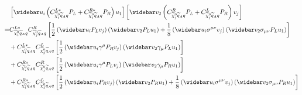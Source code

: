 \documentclass[english,notitlepage]{article}
\begin{document}
    \begin{align}
        \nonumber
          & \bclosed{\wbar{u}_i \pclosed{C^{L*}_{\nino[i]\wtilde{q}_A q} P_L + C^{R*}_{\nino[i]\wtilde{q}_A q} P_R} u_1}
        \bclosed{\wbar{v}_2 \pclosed{C^{R}_{\nino[j]\wtilde{q}_A q} P_L + C^{L}_{\nino[j]\wtilde{q}_A q} P_R} v_j}                                                                                                                                    \\
        \nonumber
        = & C^{L*}_{\nino[i]\wtilde{q}_A q}C^{R}_{\nino[j]\wtilde{q}_A q} \bclosed{\frac{1}{2}\pclosed{\wbar{u}_i P_L v_j} \pclosed{\wbar{v}_2 P_L u_1} + \frac{1}{8}\pclosed{\wbar{u}_i \sigma^{\mu\nu} v_j} \pclosed{\wbar{v}_2 \sigma_{\mu\nu} P_L u_1} }   \\
        \nonumber
          & + C^{L*}_{\nino[i]\wtilde{q}_A q}C^{L}_{\nino[j]\wtilde{q}_A q} \bclosed{\frac{1}{2}\pclosed{\wbar{u}_i \gamma^\mu P_R v_j} \pclosed{\wbar{v}_2 \gamma_\mu P_L u_1}}                                                                               \\
        \nonumber
          & + C^{R*}_{\nino[i]\wtilde{q}_A q}C^{R}_{\nino[j]\wtilde{q}_A q} \bclosed{\frac{1}{2}\pclosed{\wbar{u}_i \gamma^\mu P_L v_j} \pclosed{\wbar{v}_2 \gamma_\mu P_R u_1}}                                                                               \\
          & + C^{R*}_{\nino[i]\wtilde{q}_A q}C^{L}_{\nino[j]\wtilde{q}_A q} \bclosed{\frac{1}{2}\pclosed{\wbar{u}_i P_R v_j} \pclosed{\wbar{v}_2 P_R u_1} + \frac{1}{8}\pclosed{\wbar{u}_i \sigma^{\mu\nu} v_j} \pclosed{\wbar{v}_2 \sigma_{\mu\nu} P_R u_1} }
    \end{align}
\end{document}
